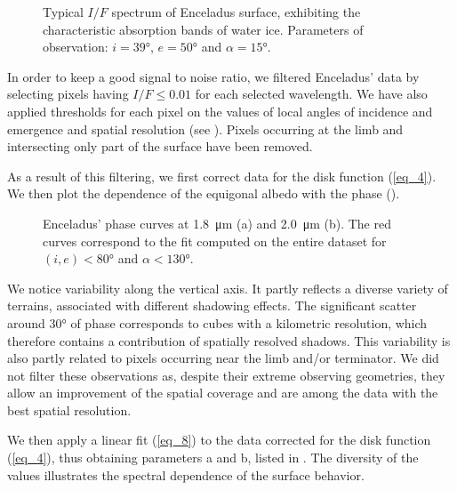 \documentclass{arxiv-icarus}
\begin{document}
\begin{figure}[!ht]
    \caption{Typical $I/F$ spectrum of Enceladus surface, exhibiting the characteristic absorption bands of water ice. Parameters of observation: $i = \ang{39}$, $e = \ang{50}$ and $\alpha = \ang{15}$.}
    \label{fig:fig_3}
\end{figure}

In order to keep a good signal to noise ratio, we filtered Enceladus' data by selecting pixels having $I/F \le 0.01$ for each selected wavelength. We have also applied thresholds for each pixel on the values of local angles of incidence and emergence and spatial resolution (see ). Pixels occurring at the limb and intersecting only part of the surface have been removed.

As a result of this filtering, we first correct data for the disk function (\eqref{eq_4}). We then plot the dependence of the equigonal albedo with the phase ().

\begin{figure}[!ht]
    \caption{Enceladus' phase curves at \SI{1.8}{\um} (a) and \SI{2.0}{\um} (b). The red curves correspond to the fit computed on the entire dataset for $(i, e) < \ang{80}$ and $\alpha < \ang{130}$.}
    \label{fig:fig_4}
\end{figure}

We notice variability along the vertical axis. It partly reflects a diverse variety of terrains, associated with different shadowing effects. The significant scatter around \ang{30} of phase corresponds to cubes with a kilometric resolution, which therefore contains a contribution of spatially resolved shadows. This variability is also partly related to pixels occurring near the limb and/or terminator. We did not filter these observations as, despite their extreme observing geometries, they allow an improvement of the spatial coverage and are among the data with the best spatial resolution.

We then apply a linear fit (\eqref{eq_8}) to the data corrected for the disk function (\eqref{eq_4}), thus obtaining parameters a and b, listed in . The diversity of the values illustrates the spectral dependence of the surface behavior.
\end{document}
